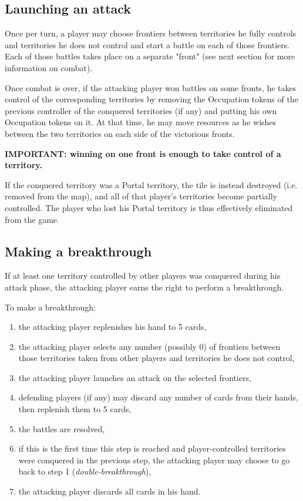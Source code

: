 \documentclass[a4paper]{article}
\begin{document}
\newpage
\subsection{Launching an attack}

    Once per turn, a player may choose frontiers between territories he fully controls
    and territories he does not control and start a battle on each of those frontiers.
    Each of those battles takes place on a separate "front"
    (see next section for more information on combat).

    Once combat is over, if the attacking player won battles on some fronts,
    he takes control of the corresponding territories by removing the Occupation tokens of
    the previous controller of the conquered territories (if any) and putting his own
    Occupation tokens on it.
    At that time, he may move resources as he wishes between the two territories on each
    side of the victorious fronts.
    
    \hspace{-2em} \textbf{
    IMPORTANT: winning on one front is enough to take control of a territory.
    }

    If the conquered territory was a Portal territory, the tile is instead destroyed
    (i.e. removed from the map), and all of that player's territories become partially
    controlled.
    The player who lost his Portal territory is thus effectively
    eliminated from the game.


\subsection{Making a breakthrough}

    If at least one territory controlled by other players was conquered during his attack
    phase, the attacking player earns the right to perform a breakthrough.

    \hspace{-2em} To make a breakthrough:
    \vspace{-1.3em}
    \begin{enumerate}
        \item the attacking player replenishes his hand to 5 cards,
        \item the attacking player selects any number (possibly 0) of frontiers between
        those territories taken from other players and territories he does not control,
        \item the attacking player launches an attack on the selected frontiers,
        \item defending players (if any) may discard any number of cards from their hands,
        then replenish them to 5 cards,
        \item the battles are resolved,
        \item if this is the first time this step is reached and player-controlled
        territories were conquered in the previous step, the attacking player may choose
        to go back to step 1 (\textit{double-breakthrough}),
        \item the attacking player discards all cards in his hand.
    \end{enumerate}
\end{document}
